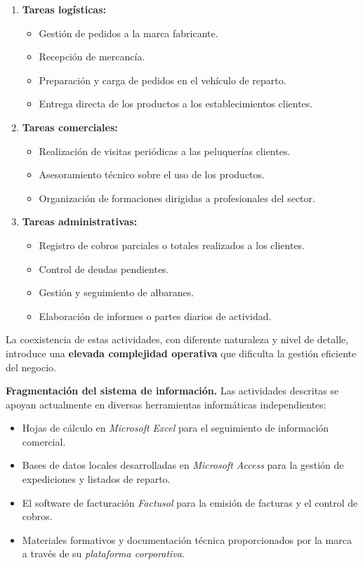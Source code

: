 \begin{enumerate}[label=\textbf{\arabic*.}, leftmargin=1.2cm, itemsep=0.3em, topsep=0.25em]
  \item \textbf{Tareas logísticas:}
  \begin{itemize}[topsep=0.1em, itemsep=0.05em]
    \item Gestión de pedidos a la marca fabricante.
    \item Recepción de mercancía.
    \item Preparación y carga de pedidos en el vehículo de reparto.
    \item Entrega directa de los productos a los establecimientos clientes.
  \end{itemize}

  \item \textbf{Tareas comerciales:}
  \begin{itemize}[topsep=0.1em, itemsep=0.05em]
    \item Realización de visitas periódicas a las peluquerías clientes.
    \item Asesoramiento técnico sobre el uso de los productos.
    \item Organización de formaciones dirigidas a profesionales del sector.
  \end{itemize}

  \item \textbf{Tareas administrativas:}
  \begin{itemize}[topsep=0.1em, itemsep=0.05em]
    \item Registro de cobros parciales o totales realizados a los clientes.
    \item Control de deudas pendientes.
    \item Gestión y seguimiento de albaranes.
    \item Elaboración de informes o partes diarios de actividad.
  \end{itemize}
\end{enumerate}

La coexistencia de estas actividades, con diferente naturaleza y nivel de detalle, introduce una \textbf{elevada complejidad operativa} que dificulta la gestión eficiente del negocio.

\noindent\textbf{Fragmentación del sistema de información.} Las actividades descritas se apoyan actualmente en diversas herramientas informáticas independientes:

\begin{itemize}[topsep=0.2em, itemsep=0.1em]
  \item Hojas de cálculo en \textit{Microsoft Excel} para el seguimiento de información comercial.
  \item Bases de datos locales desarrolladas en \textit{Microsoft Access} para la gestión de expediciones y listados de reparto.
  \item El software de facturación \textit{Factusol} para la emisión de facturas y el control de cobros.
  \item Materiales formativos y documentación técnica proporcionados por la marca a través de su \textit{plataforma corporativa}.
\end{itemize}


